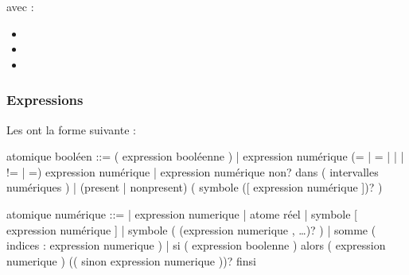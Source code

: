 \documentclass[letterpaper,10pt,french]{sphinxmanual}
\begin{document}
\sphinxAtStartPar
avec :
\begin{itemize}
\item {} 
\sphinxAtStartPar
{}

\item {} 
\sphinxAtStartPar
{}

\item {} 
\sphinxAtStartPar
{}

\end{itemize}


\subsubsection{Expressions}
\label{\detokenize{syntax:expressions}}
\sphinxAtStartPar
Les  ont la forme suivante :

\begin{sphinxVerbatim}[commandchars=\\\{\}]
\PYGZlt{}atomique booléen\PYGZgt{} ::=
( \PYGZlt{}expression booléenne\PYGZgt{} )
| \PYGZlt{}expression numérique\PYGZgt{} (\PYGZlt{}= | \PYGZgt{}= | \PYGZlt{} | \PYGZgt{} | != | =) \PYGZlt{}expression numérique\PYGZgt{}
| \PYGZlt{}expression numérique\PYGZgt{} non? dans ( \PYGZlt{}intervalles numériques\PYGZgt{} )
| (present | non\PYGZus{}present) ( \PYGZlt{}symbole\PYGZgt{} ([ \PYGZlt{}expression numérique\PYGZgt{} ])? )

\PYGZlt{}atomique numérique\PYGZgt{} ::=
| \PYGZlt{}expression numerique\PYGZgt{}
| \PYGZlt{}atome réel\PYGZgt{}
| \PYGZlt{}symbole\PYGZgt{} [ \PYGZlt{}expression numérique\PYGZgt{} ]
| \PYGZlt{}symbole\PYGZgt{} ( (\PYGZlt{}expression numerique\PYGZgt{} , …)? )
| somme ( \PYGZlt{}indices\PYGZgt{} : \PYGZlt{}expression numerique\PYGZgt{} )
| si ( \PYGZlt{}expression boolenne\PYGZgt{} )
  alors ( \PYGZlt{}expression numerique\PYGZgt{} )
  (( sinon \PYGZlt{}expression numerique\PYGZgt{} ))?
  finsi
\end{sphinxVerbatim}
\end{document}
